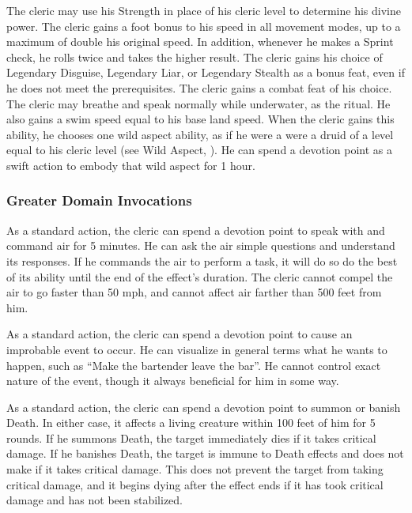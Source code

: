 The cleric may use his Strength in place of his cleric level to determine his divine power.
The cleric gains a  foot bonus to his speed in all movement modes, up to a maximum of double his original speed.
In addition, whenever he makes a Sprint check, he rolls twice and takes the higher result.
The cleric gains his choice of Legendary Disguise, Legendary Liar, or Legendary Stealth as a bonus feat, even if he does not meet the prerequisites.
The cleric gains a combat feat of his choice.
 The cleric may breathe and speak normally while underwater, as the 
ritual.
He also gains a swim speed equal to his base land speed.
When the cleric gains this ability, he chooses one wild aspect ability, as if he were a were a druid of a level equal to his cleric level (see Wild Aspect, ).
He can spend a devotion point as a swift action to embody that wild aspect for 1 hour.

\subsubsection{Greater Domain Invocations}\label{Greater Domain Invocations}

As a standard action, the cleric can spend a devotion point to speak with and command air for 5 minutes.
He can ask the air simple questions and understand its responses.
If he commands the air to perform a task, it will do so do the best of its ability until the end of the effect's duration.
The cleric cannot compel the air to go faster than 50 mph, and cannot affect air farther than 500 feet from him.

As a standard action, the cleric can spend a devotion point to cause an improbable event to occur.
He can visualize in general terms what he wants to happen, such as ``Make the bartender leave the bar''.
He cannot control exact nature of the event, though it always beneficial for him in some way.

As a standard action, the cleric can spend a devotion point to summon or banish Death.
In either case, it affects a living creature within 100 feet of him for 5 rounds.
If he summons Death, the target immediately dies if it takes critical damage.
If he banishes Death, the target is immune to Death effects and does not make  if it takes critical damage.
This does not prevent the target from taking critical damage, and it begins dying after the effect ends if it has took critical damage and has not been stabilized.

